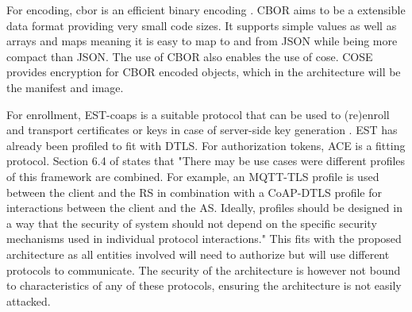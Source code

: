 \documentclass[0-thesis.tex]{subfiles}
\begin{document}
For encoding, \gls{cbor} is an efficient binary encoding \parencite{rfc7049}. CBOR aims to
be a extensible data format providing very small code sizes. It supports simple values as
well as arrays and maps meaning it is easy to map to and from JSON while being more
compact than JSON. The use of CBOR also enables the use of \gls{cose}. COSE provides
encryption for CBOR encoded objects, which in the architecture will be the manifest and
image.


For enrollment, EST-coaps is a suitable protocol that can be used to (re)enroll and
transport certificates or keys in case of server-side key generation
\parencite{est-coaps}. EST has already been profiled to fit with DTLS. For authorization
tokens, ACE is a fitting protocol. Section 6.4 of \parencite{ace} states that "There may
be use cases were different profiles of this framework are combined.  For example, an
MQTT-TLS profile is used between the client and the RS in combination with a CoAP-DTLS
profile for interactions between the client and the AS.  Ideally, profiles should be
designed in a way that the security of system should not depend on the specific security
mechanisms used in individual protocol interactions." This fits with the proposed
architecture as all entities involved will need to authorize but will use different
protocols to communicate. The security of the architecture is however not bound to
characteristics of any of these protocols, ensuring the architecture is not easily
attacked.

\end{document}
